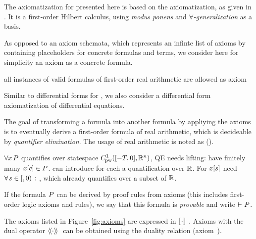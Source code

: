 
    The axiomatization for \ddL presented here is based on the \dL axiomatization, as given in \cite{Platzer12Complete}.
    It is a first-order Hilbert calculus, using \emph{modus ponens} and \emph{$\forall$-generalization} as a basis.

    As opposed to an axiom schemata, which represents an infinte list of axioms by containing placeholders for concrete formulas and terms, we consider here for simplicity an axiom as a concrete formula.

    all instances of valid formulas of first-order real arithmetic are allowed as axiom

    Similar to differential forms for \dL \cite{Platzer15Uniform}, we also consider a differential form axiomatization of differential equations.

    The goal of transforming a \ddL formula into another formula by appliying the axioms is to eventually derive a first-order formula of real arithmetic, which is decideable by \emph{quantifier elimination}. The usage of real arithmetic is noted as ().

    $\forall x{\,} P$ quantifies over statespace $\statespace$, QE needs lifting: have finitely many $x[c]\in P$. can introduce for each a quantification over $\mathbb{R}$. For $x[s]$ need $\forall\mkern2mu s\in[,0)\mathrel{\colon}$, which already quantifies over a subset of $\mathbb{R}$.

    If the \ddL formula $P$ can be derived by \ddL proof rules from \ddL axioms (this includes first-order logic axioms and rules), we say that this formula is \emph{provable} and write $\vdash_{}P$.

    The axioms listed in Figure~\ref{fig:axioms} are expressed in $\dbox{\cdot}$. Axioms with the dual operator $\ddiamond{\cdot}$ can be obtained using the duality relation (axiom~).
    

